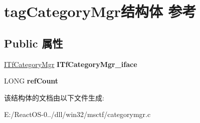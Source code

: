 \hypertarget{structtag_category_mgr}{}\section{tag\+Category\+Mgr结构体 参考}
\label{structtag_category_mgr}
\subsection*{Public 属性}
\begin{DoxyCompactItemize}
\item 
\mbox{\label{structtag_category_mgr_a8b67ad9d9fb0bc2cfec52d7c84ad1dde}} 
\hyperlink{interface_i_tf_category_mgr}{I\+Tf\+Category\+Mgr} {\bfseries I\+Tf\+Category\+Mgr\+\_\+iface}
\item 
\mbox{\label{structtag_category_mgr_a1e8181b35ffee52489d424043216f80d}} 
L\+O\+NG {\bfseries ref\+Count}
\end{DoxyCompactItemize}


该结构体的文档由以下文件生成\+:\begin{DoxyCompactItemize}
\item 
E\+:/\+React\+O\+S-\/0../dll/win32/msctf/categorymgr.\+c\end{DoxyCompactItemize}
